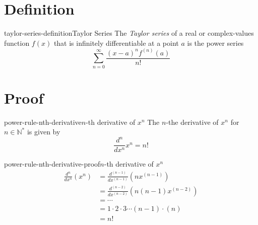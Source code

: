\documentclass[preview]{standalone}
\begin{document}
\genpage

\section{Definition}

\begin{snippetdefinition}{taylor-series-definition}{Taylor Series}
    The \textit{Taylor series} of a real or complex-values function \(f(x)\)
    that is infinitely differentiable at a point \(a\) is the power series
    \[
        \sum_{n=0}^{\infty}\frac{{(x-a)}^n f^{(n)}(a)}{n!}
    \]
\end{snippetdefinition}

\section{Proof}

\begin{snippetproposition}{power-rule-nth-derivative}{\(n\)-th derivative of \(x^n\)}
    The \(n\)-the derivative of \(x^n\) for \(n \in \mathbb{N}^*\)
    is given by
    \[
        \frac{d^n}{dx^n} x^n = n!
    \]
\end{snippetproposition}

\begin{snippetproof}{power-rule-nth-derivative-proof}{\(n\)-th derivative of \(x^n\)}
    \begin{align*}
        \frac{d^n}{dx^n}\left(x^n\right)
        &=\frac{d^{(n-1)}}{dx^{(n-1)}}\left(nx^{(n-1)}\right)\\
        &=\frac{d^{(n-2)}}{dx^{(n-2)}}\left(n(n-1)x^{(n-2)}\right)\\
        &=\cdots\\
        &=1\cdot 2 \cdot 3 \cdots (n-1) \cdot (n) \\
        &=n!
    \end{align*}
\end{snippetproof}
\end{document}
